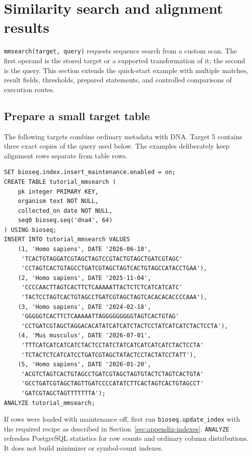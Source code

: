 \section{Similarity search and alignment results}
\label{sec:appendix-search}

\texttt{mmsearch(target, query)} requests sequence search from a custom scan.
The first operand is the stored target or a supported transformation of it;
the second is the query. This section extends the quick-start example with
multiple matches, result fields, thresholds, prepared statements, and
controlled comparisons of execution routes.

\subsection{Prepare a small target table}

The following targets combine ordinary metadata with DNA. Target 5 contains
three exact copies of the query used below. The examples deliberately keep
alignment rows separate from table rows.

\par\noindent\begin{minipage}{\linewidth}
\begin{lstlisting}[style=bioseq-appendix-sql]
SET bioseq.index.insert_maintenance.enabled = on;
CREATE TABLE tutorial_mmsearch (
    pk integer PRIMARY KEY,
    organism text NOT NULL,
    collected_on date NOT NULL,
    seq0 bioseq.seq('dna4', 64)
) USING bioseq;
INSERT INTO tutorial_mmsearch VALUES
    (1, 'Homo sapiens', DATE '2026-06-10',
     'TCACTGTAGGATCGTAGCTAGTCCGTACTGTAGCTGATCGTAGC'
     'CCTAGTCACTGTAGCCTGATCGTAGCTAGTCACTGTAGCCATACCTGAA'),
    (2, 'Homo sapiens', DATE '2025-11-04',
     'CCCCAACTTAGTCACTTCTCAAAAATTACTCTCTCATCATCATC'
     'TACTCCTAGTCACTGTAGCCTGATCGTAGCTAGTCACACACACCCCAAA'),
    (3, 'Homo sapiens', DATE '2024-02-18',
     'GGGGGTCACTTCTCAAAAATTAGGGGGGGGGTAGTCACTGTAG'
     'CCTGATCGTAGCTAGGACACATATCATCATCTACTCCTATCATCATCTACTCCTA'),
    (4, 'Mus musculus', DATE '2026-07-01',
     'TTTCATCATCATCATCTACTCCTATCTATCATCATCATCATCTACTCCTA'
     'TCTACTCTCATCATCCTGATCGTAGCTATACTCCTACTATCCTATT'),
    (5, 'Homo sapiens', DATE '2026-01-20',
     'ACGTCTAGTCACTGTAGCCTGATCGTAGCTAGTGTACTCTAGTCACTGTA'
     'GCCTGATCGTAGCTAGTTGATCCCCATATCTTCACTAGTCACTGTAGCCT'
     'GATCGTAGCTAGTTTTTTTA');
ANALYZE tutorial_mmsearch;
\end{lstlisting}
\end{minipage}

If rows were loaded with maintenance off, first run
\texttt{bioseq.update\_index} with the required recipe as described in
Section~\ref{sec:appendix-indexes}. \texttt{ANALYZE} refreshes PostgreSQL
statistics for row counts and ordinary column distributions. It does not
build minimizer or symbol-count indexes.

